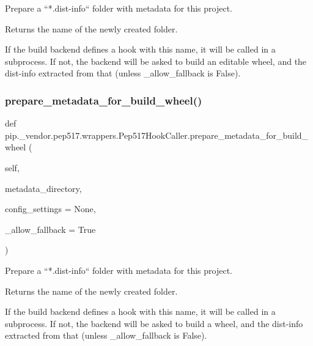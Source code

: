 \begin{DoxyVerb}Prepare a ``*.dist-info`` folder with metadata for this project.

Returns the name of the newly created folder.

If the build backend defines a hook with this name, it will be called
in a subprocess. If not, the backend will be asked to build an editable
wheel, and the dist-info extracted from that (unless _allow_fallback is
False).
\end{DoxyVerb}
 \mbox{\label{classpip_1_1__vendor_1_1pep517_1_1wrappers_1_1Pep517HookCaller_a0d16360f48a848001b3d0890220f6709}} 
\subsubsection{\texorpdfstring{prepare\+\_\+metadata\+\_\+for\+\_\+build\+\_\+wheel()}{prepare\_metadata\_for\_build\_wheel()}}
{\footnotesize\ttfamily def pip.\+\_\+vendor.\+pep517.\+wrappers.\+Pep517\+Hook\+Caller.\+prepare\+\_\+metadata\+\_\+for\+\_\+build\+\_\+wheel (\begin{DoxyParamCaption}\item[{}]{self,  }\item[{}]{metadata\+\_\+directory,  }\item[{}]{config\+\_\+settings = {\ttfamily None},  }\item[{}]{\+\_\+allow\+\_\+fallback = {\ttfamily True} }\end{DoxyParamCaption})}

\begin{DoxyVerb}Prepare a ``*.dist-info`` folder with metadata for this project.

Returns the name of the newly created folder.

If the build backend defines a hook with this name, it will be called
in a subprocess. If not, the backend will be asked to build a wheel,
and the dist-info extracted from that (unless _allow_fallback is
False).
\end{DoxyVerb}
 \mbox{\label{classpip_1_1__vendor_1_1pep517_1_1wrappers_1_1Pep517HookCaller_a935d5063d39b46ecf8e100a34dee4fb6}} 
